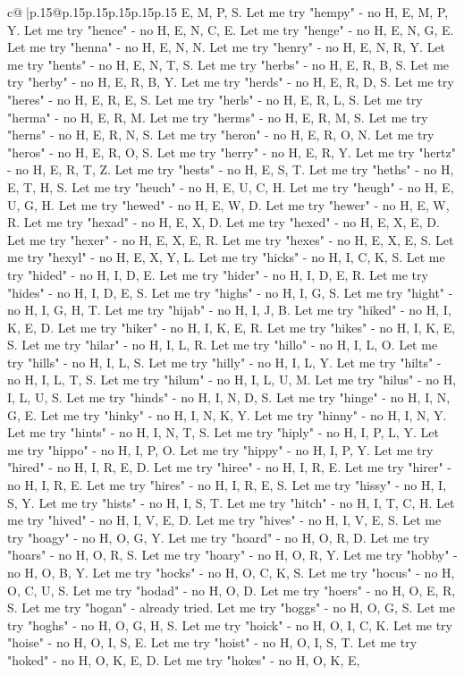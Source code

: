 \documentclass{article}
\begin{document}
{\begin{supertabular}{c@{$\;$}|p{.15\linewidth}@{}p{.15\linewidth}p{.15\linewidth}p{.15\linewidth}p{.15\linewidth}p{.15\linewidth}}
{{{E, M, P, S. Let me try "hempy" {-} no H, E, M, P, Y. Let me try "hence" {-} no H, E, N, C, E. Let me try "henge" {-} no H, E, N, G, E. Let me try "henna" {-} no H, E, N, N. Let me try "henry" {-} no H, E, N, R, Y. Let me try "hents" {-} no H, E, N, T, S. Let me try "herbs" {-} no H, E, R, B, S. Let me try "herby" {-} no H, E, R, B, Y. Let me try "herds" {-} no H, E, R, D, S. Let me try "heres" {-} no H, E, R, E, S. Let me try "herls" {-} no H, E, R, L, S. Let me try "herma" {-} no H, E, R, M. Let me try "herms" {-} no H, E, R, M, S. Let me try "herns" {-} no H, E, R, N, S. Let me try "heron" {-} no H, E, R, O, N. Let me try "heros" {-} no H, E, R, O, S. Let me try "herry" {-} no H, E, R, Y. Let me try "hertz" {-} no H, E, R, T, Z. Let me try "hests" {-} no H, E, S, T. Let me try "heths" {-} no H, E, T, H, S. Let me try "heuch" {-} no H, E, U, C, H. Let me try "heugh" {-} no H, E, U, G, H. Let me try "hewed" {-} no H, E, W, D. Let me try "hewer" {-} no H, E, W, R. Let me try "hexad" {-} no H, E, X, D. Let me try "hexed" {-} no H, E, X, E, D. Let me try "hexer" {-} no H, E, X, E, R. Let me try "hexes" {-} no H, E, X, E, S. Let me try "hexyl" {-} no H, E, X, Y, L. Let me try "hicks" {-} no H, I, C, K, S. Let me try "hided" {-} no H, I, D, E. Let me try "hider" {-} no H, I, D, E, R. Let me try "hides" {-} no H, I, D, E, S. Let me try "highs" {-} no H, I, G, S. Let me try "hight" {-} no H, I, G, H, T. Let me try "hijab" {-} no H, I, J, B. Let me try "hiked" {-} no H, I, K, E, D. Let me try "hiker" {-} no H, I, K, E, R. Let me try "hikes" {-} no H, I, K, E, S. Let me try "hilar" {-} no H, I, L, R. Let me try "hillo" {-} no H, I, L, O. Let me try "hills" {-} no H, I, L, S. Let me try "hilly" {-} no H, I, L, Y. Let me try "hilts" {-} no H, I, L, T, S. Let me try "hilum" {-} no H, I, L, U, M. Let me try "hilus" {-} no H, I, L, U, S. Let me try "hinds" {-} no H, I, N, D, S. Let me try "hinge" {-} no H, I, N, G, E. Let me try "hinky" {-} no H, I, N, K, Y. Let me try "hinny" {-} no H, I, N, Y. Let me try "hints" {-} no H, I, N, T, S. Let me try "hiply" {-} no H, I, P, L, Y. Let me try "hippo" {-} no H, I, P, O. Let me try "hippy" {-} no H, I, P, Y. Let me try "hired" {-} no H, I, R, E, D. Let me try "hiree" {-} no H, I, R, E. Let me try "hirer" {-} no H, I, R, E. Let me try "hires" {-} no H, I, R, E, S. Let me try "hissy" {-} no H, I, S, Y. Let me try "hists" {-} no H, I, S, T. Let me try "hitch" {-} no H, I, T, C, H. Let me try "hived" {-} no H, I, V, E, D. Let me try "hives" {-} no H, I, V, E, S. Let me try "hoagy" {-} no H, O, G, Y. Let me try "hoard" {-} no H, O, R, D. Let me try "hoars" {-} no H, O, R, S. Let me try "hoary" {-} no H, O, R, Y. Let me try "hobby" {-} no H, O, B, Y. Let me try "hocks" {-} no H, O, C, K, S. Let me try "hocus" {-} no H, O, C, U, S. Let me try "hodad" {-} no H, O, D. Let me try "hoers" {-} no H, O, E, R, S. Let me try "hogan" {-} already tried. Let me try "hoggs" {-} no H, O, G, S. Let me try "hoghs" {-} no H, O, G, H, S. Let me try "hoick" {-} no H, O, I, C, K. Let me try "hoise" {-} no H, O, I, S, E. Let me try "hoist" {-} no H, O, I, S, T. Let me try "hoked" {-} no H, O, K, E, D. Let me try "hokes" {-} no H, O, K, E, }}}
\end{supertabular}}
\end{document}
